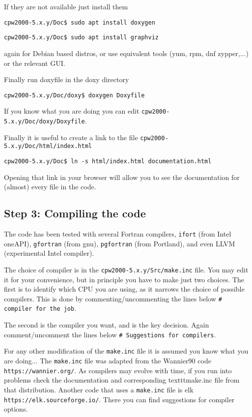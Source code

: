 \documentclass[11pt]{article}
\begin{document}
If they are not available just install them

\noindent\texttt{cpw2000-5.x.y/Doc\$ sudo apt install doxygen}

\noindent\texttt{cpw2000-5.x.y/Doc\$ sudo apt install graphviz}

again for Debian based distros, or use equivalent tools (yum, rpm, dnf zypper,...) or the relevant GUI.

Finally run doxyfile in the doxy directory

\noindent\texttt{cpw2000-5.x.y/Doc/doxy\$ doxygen Doxyfile}

If you know what you are doing you can edit \texttt{cpw2000-5.x.y/Doc/doxy/Doxyfile}.

Finally it is useful to create a link to the file \texttt{cpw2000-5.x.y/Doc/html/index.html}

\noindent\texttt{cpw2000-5.x.y/Doc\$ ln -s html/index.html documentation.html}

Opening that link in your browser will allow you to see the documentation for (almost) every file in the code.

\subsection{Step 3: Compiling the code}
\label{sec:step3}

The code has been tested with several Fortran compilers, \texttt{ifort} (from Intel oneAPI),
\texttt{gfortran} (from gnu),
\texttt{pgfortran} (from Portland), and even LLVM (experimental Intel compiler).

The choice of compiler is in the \texttt{cpw2000-5.x.y/Src/make.inc} file.  You may edit it for your convenience,
but in principle you have to make just two choices.  The first is to identify which CPU you are using,
as it narrows the choice of possible compilers.  This is done by commenting/uncommenting
the lines below \texttt{\#   compiler for the job}.

The second is the compiler you want, and is the key decision.  Again comment/uncomment the lines below
\texttt{\#   Suggestions for compilers}.


For any other modification of the \texttt{make.inc} file it is assumed you know what you are doing...
The \texttt{make.inc} file was adapted from the {\sc Wannier90} code
\texttt{https://wannier.org/}.
As compilers may evolve with time, if you run into problems check
the documentation and corresponding texttt{make.inc} file from that distribution.
Another code that uses a \texttt{make.inc} file is {\sc elk}
\texttt{https://elk.sourceforge.io/}.  There you can find suggestions for
compiler options.
\end{document}

